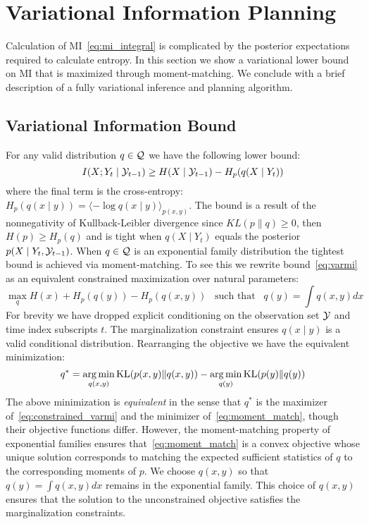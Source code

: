\documentclass{article}
\begin{document}
\section{Variational Information Planning}

Calculation of MI~\eqref{eq:mi_integral} is complicated by the
posterior expectations required to calculate entropy.  In this section
we show a variational lower bound on MI that is maximized through
moment-matching.  We conclude with a brief description of a fully
variational inference and planning algorithm.

\subsection{Variational Information Bound}

For any valid distribution $q\in\mathcal{Q}$ we have the following lower
bound:
\begin{equation}\label{eq:varmi}
  I(X;Y_t \mid \mathcal{Y}_{t-1} ) \geq H(X \mid \mathcal{Y}_{t-1}) - H_p( q(X\mid
  Y_t) ) 
\end{equation}
where the final term is the cross-entropy: $H_p(q(x\mid y)) =\langle -
\log q(x\mid y) \rangle_{p(x,y)}$.  The bound is a result of the
nonnegativity of Kullback-Leibler divergence since $KL(p\|q) \geq 0$,
then $H(p) \geq H_p(q)$ and is tight when $q(X \mid Y_t)$ equals the
posterior $p(X \mid Y_t, \mathcal{Y}_{t-1})$.  When $q\in\mathcal{Q}$ is an
exponential family distribution the tightest bound is achieved via
moment-matching.  To see this we rewrite bound~\eqref{eq:varmi} as an
equivalent constrained maximization over natural parameters:
\begin{equation}\label{eq:constrained_varmi}
  \max_q H(x) + H_p( q(y) ) - H_p(
  q(x,y) ) \;\;\;\text{such that}\;\;\; q(y) = \int q(x,y) dx
\end{equation}
For brevity we have dropped explicit conditioning on the observation
set $\mathcal{Y}$ and time index subscripts $t$.  The marginalization
constraint ensures $q(x \mid y)$ is a valid conditional distribution.
Rearranging the objective we have the equivalent minimization:
\begin{equation}\label{eq:moment_match}
  q^{*} = \operatorname*{arg\,min}_{q(x,y)} \text{KL}( p(x,y) \| q(x,y) ) - \operatorname*{arg\,min}_{q(y)} \text{KL}(p(y) \| q(y))
\end{equation}
The above minimization is \emph{equivalent} in the sense that $q^{*}$
is the maximizer of~\eqref{eq:constrained_varmi} and the minimizer
of~\eqref{eq:moment_match}, though their objective functions differ.
However, the moment-matching property of exponential families ensures
that~\eqref{eq:moment_match} is a convex objective whose unique
solution corresponds to matching the expected sufficient statistics of
$q$ to the corresponding moments of $p$.  We choose $q(x,y)$ so that
$q(y) = \int q(x,y) dx$ remains in the exponential family.  This
choice of $q(x,y)$ ensures that the solution to the unconstrained
objective satisfies the marginalization constraints.
\end{document}
